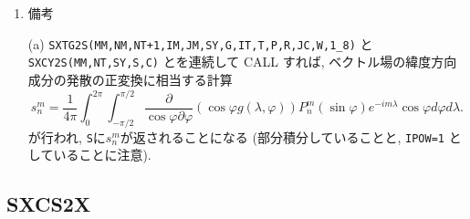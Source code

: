 \documentclass[a4j]{jsarticle}
\begin{document}
\begin{enumerate}
\item 備考

(a) \texttt{SXTG2S(MM,NM,NT+1,IM,JM,SY,G,IT,T,P,R,JC,W,1\_8)} と
    \texttt{SXCY2S(MM,NT,SY,S,C)} とを連続して CALL すれば,
    ベクトル場の緯度方向成分の発散の正変換に相当する計算
\begin{equation}
s^m_n=\frac1{4\pi}\int^{2\pi}_0\int^{\pi/2}_{-\pi/2}
\frac{\partial}{\cos\varphi\partial\varphi}
\left(\cos\varphi g(\lambda,\varphi)\right)
P^m_n(\sin\varphi)
e^{-im\lambda}\cos\varphi d\varphi
d\lambda .
\end{equation}
が行われ, \texttt{S}に$s^m_n$が返されることになる
(部分積分していることと, \texttt{IPOW=1} としていることに注意).
    
\end{enumerate}


\subsection{SXCS2X}
\end{document}
